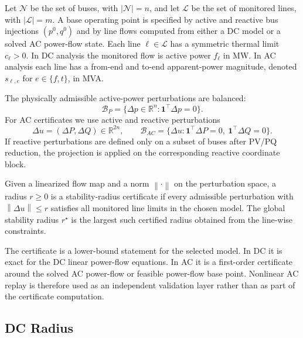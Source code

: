 \documentclass[energies,article,submit,pdftex,moreauthors]{Definitions/mdpi}
\newcommand{\R}{\mathbb{R}}
\newcommand{\ones}{\mathbf{1}}
\newcommand{\norm}[1]{\left\lVert #1 \right\rVert}
\begin{document}
Let $\mathcal{N}$ be the set of buses, with $|\mathcal{N}|=n$, and let $\mathcal{L}$ be the set of monitored lines, with $|\mathcal{L}|=m$. A base operating point is specified by active and reactive bus injections $(p^0,q^0)$ and by line flows computed from either a DC model or a solved AC power-flow state. Each line $\ell\in\mathcal{L}$ has a symmetric thermal limit $c_\ell>0$. In DC analysis the monitored flow is active power $f_\ell$ in MW. In AC analysis each line has a from-end and to-end apparent-power magnitude, denoted $s_{\ell,e}$ for $e\in\{f,t\}$, in MVA.

The physically admissible active-power perturbations are balanced:
\begin{equation}
  \mathcal{B}_P = \{ \Delta p\in\R^n : \ones^\top \Delta p = 0 \}.
\end{equation}
For AC certificates we use active and reactive perturbations
\begin{equation}
  \Delta u = (\Delta P,\Delta Q)\in\R^{2n},
  \qquad
  \mathcal{B}_{AC} =
  \{ \Delta u : \ones^\top\Delta P=0,\ \ones^\top\Delta Q=0 \}.
\end{equation}
If reactive perturbations are defined only on a subset of buses after PV/PQ reduction, the projection is applied on the corresponding reactive coordinate block.

\begin{Definition}
Given a linearized flow map and a norm $\norm{\cdot}$ on the perturbation space, a radius $r\ge 0$ is a stability-radius certificate if every admissible perturbation with $\norm{\Delta u}\le r$ satisfies all monitored line limits in the chosen model. The global stability radius $r^\star$ is the largest such certified radius obtained from the line-wise constraints.
\end{Definition}

The certificate is a lower-bound statement for the selected model. In DC it is exact for the DC linear power-flow equations. In AC it is a first-order certificate around the solved AC power-flow or feasible power-flow base point. Nonlinear AC replay is therefore used as an independent validation layer rather than as part of the certificate computation.

\subsection{DC Radius}
\end{document}
